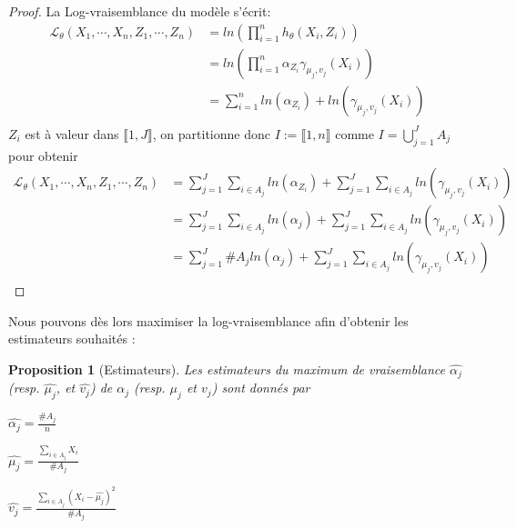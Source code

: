 \documentclass[frenchb]{report}
\newcommand{\1}{\mathbbm{1}}
\newtheorem{prop}{Proposition}
\theoremstyle{definition}\newtheorem{defn}{Définition}
\theoremstyle{definition}\newtheorem{exm}{Exemple}
\theoremstyle{definition}\newtheorem{nota}{Notation}
\theoremstyle{definition}\newtheorem{rem}{Remarque}
\begin{document}
\begin{proof}
La Log-vraisemblance du modèle s'écrit:
\begin{align*}
\mathcal{L}_\theta(X_1, \cdots, X_n, Z_1, \cdots, Z_n) &= ln\left(\displaystyle\prod_{i=1}^n h_\theta(X_i, Z_i) \right)\\
&= ln\left(\displaystyle\prod_{i=1}^n  \alpha_{Z_i}\gamma_{\mu_j, v_j}(X_i) \right)\\
&= \displaystyle\sum_{i=1}^n ln(\alpha_{Z_i})+ ln(\gamma_{\mu_j, v_j}(X_i))\\
\end{align*}
$Z_i$ est à valeur dans $\llbracket1,J \rrbracket$, on  partitionne donc $I := \llbracket1,n \rrbracket$ comme $I = \displaystyle\bigcup_{j=1}^J A_j$ pour obtenir
\begin{align*}
\mathcal{L}_\theta(X_1, \cdots, X_n, Z_1, \cdots, Z_n) &=  \displaystyle\sum_{j=1}^J\sum_{i\in A_j} ln(\alpha_{Z_i})+ \sum_{j=1}^J\sum_{i\in A_j} ln(\gamma_{\mu_j, v_j}(X_i))\\
&= \displaystyle\sum_{j=1}^J\sum_{i\in A_j} ln(\alpha_j)+ \sum_{j=1}^J\sum_{i\in A_j} ln(\gamma_{\mu_j, v_j}(X_i)) \\
&= \displaystyle\sum_{j=1}^J \#A_j ln(\alpha_j)+ \sum_{j=1}^J\sum_{i\in A_j} ln(\gamma_{\mu_j, v_j}(X_i)) \\
\end{align*}
\end{proof}
Nous pouvons dès lors maximiser la log-vraisemblance afin d'obtenir les estimateurs souhaités :
\begin{prop}[Estimateurs]
Les estimateurs du maximum de vraisemblance $\hat{\alpha_j}$ (resp. $\hat{\mu_j}$, et $\hat{v_j}$) de $\alpha_j$ (resp. $\mu_j$ et $v_j$) sont donnés par
\begin{center}
$\hat{\alpha_j} = \frac{\#A_j}{n}$
\end{center}
\begin{center}
$ \hat{\mu_j} = \displaystyle\frac{\sum_{i\in A_j} X_i}{\#A_j} $
\end{center}
\begin{center}
$ \hat{v_j} = \displaystyle \frac{\sum_{i\in A_j}(X_i - \hat{\mu_j})^2}{\#A_j}$
\end{center}
\end{prop}
\end{document}

